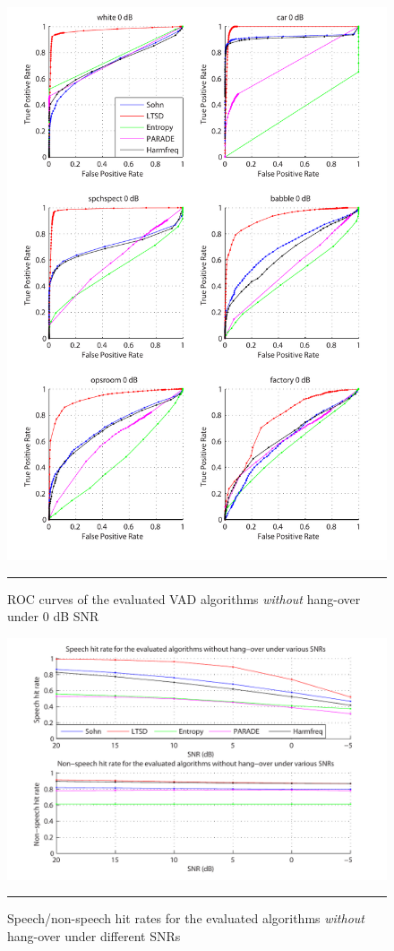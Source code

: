 \begin{figure}[htbp]
	\centering
		\includegraphics[width=1.0\columnwidth]{Figures/Chapter4/0dBnoh.pdf}
		\rule{37em}{0.5pt}
	\caption[ROC curves of the evaluated algorithms \emph{without} hang-over under 0 dB SNR]{ROC curves of the evaluated VAD algorithms \emph{without} hang-over under 0 dB SNR}
	\label{fig:0dBnoh}
\end{figure}

\begin{figure}[htbp]
	\centering
		\includegraphics[width=0.9\columnwidth]{Figures/Chapter4/snrnoh.pdf}
		\rule{37em}{0.5pt}
	\caption[Speech/non-speech hit rates for the evaluated algorithms \emph{without} hang-over under different SNRs]{Speech/non-speech hit rates for the evaluated algorithms \emph{without} hang-over under different SNRs}
	\label{fig:snrnoh}
\end{figure}